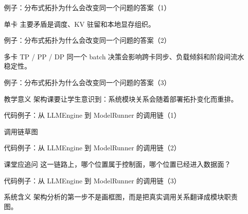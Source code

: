 \begin{frame}{例子：分布式拓扑为什么会改变同一个问题的答案（1）}
\begin{block}{单卡}
    主要矛盾是调度、KV 驻留和本地显存组织。
  \end{block}
\end{frame}

\begin{frame}{例子：分布式拓扑为什么会改变同一个问题的答案（2）}
\begin{block}{多卡 TP / PP / DP}
    同一个 batch 决策会影响跨卡同步、负载倾斜和阶段间流水稳定性。
  \end{block}
\end{frame}

\begin{frame}{例子：分布式拓扑为什么会改变同一个问题的答案（3）}
\begin{block}{教学意义}
    架构课要让学生意识到：系统模块关系会随着部署拓扑变化而重排。
  \end{block}
\end{frame}

\begin{frame}{代码例子：从 LLMEngine 到 ModelRunner 的调用链（1）}
\begin{block}{调用链草图}
    {\ttfamily\small
    \par
    \par
    \par
    }
  \end{block}
\end{frame}

\begin{frame}{代码例子：从 LLMEngine 到 ModelRunner 的调用链（2）}
\begin{block}{课堂应追问}
    这一链路上，哪个位置属于控制面，哪个位置已经进入数据面？
  \end{block}
\end{frame}

\begin{frame}{代码例子：从 LLMEngine 到 ModelRunner 的调用链（3）}
\begin{block}{系统含义}
    架构分析的第一步不是画框图，而是把真实调用关系翻译成模块职责图。
  \end{block}
\end{frame}

